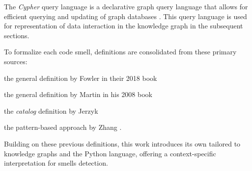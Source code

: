 The \textit{Cypher} query language is a declarative graph query language that allows for efficient querying and updating of graph databases \cite{neo4j_cypher_overview}. This query language is used for representation of data interaction in the knowledge graph in the subsequent sections.


To formalize each code smell, definitions are consolidated from these primary sources: 
\begin{enumerate*}[label={\alph*)},font={\color{cyan!50!black}\bfseries}]
\item the general definition by Fowler \etal in their 2018 book \cite{Martin_2018}
\item the general definition by Martin in his 2008 book \cite{Martin_2008}
\item the \textit{catalog} definition by Jerzyk \etal \cite{Jerzyk_2023}
\item the pattern-based approach by Zhang \etal \cite{Zhang_2008}.
\end{enumerate*}
Building on these previous definitions, this work introduces its own tailored to knowledge graphs and the Python language, offering a context-specific interpretation for smells detection.










